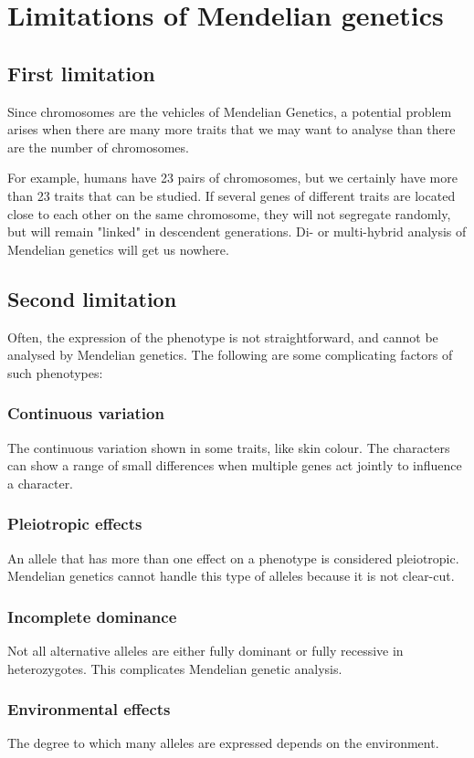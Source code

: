 \documentclass[11pt]{article}
\begin{document}
\section{Limitations of Mendelian genetics}
\label{sec:org412d7b7}

\subsection{First limitation}
\label{sec:orga2261d9}
Since chromosomes are the vehicles of Mendelian Genetics, a potential problem arises when there are many more traits that we may want to analyse than there are the number of chromosomes.


For example, humans have 23 pairs of chromosomes, but we certainly have more than 23 traits that can be studied. If several genes of different traits are located close to each other on the same chromosome, they will not segregate randomly, but will remain "linked" in descendent generations. Di- or multi-hybrid analysis of Mendelian genetics will get us nowhere.
\subsection{Second limitation}
\label{sec:orgb66cc55}
Often, the expression of the phenotype is not straightforward, and cannot be analysed by Mendelian genetics. The following are some complicating factors of such phenotypes:
\subsubsection{Continuous variation}
\label{sec:org15643c1}
The continuous variation shown in some traits, like skin colour. The characters can show a range of small differences when multiple genes act jointly to influence a character.
\subsubsection{Pleiotropic effects}
\label{sec:org99223fd}
An allele that has more than one effect on a phenotype is considered pleiotropic. Mendelian genetics cannot handle this type of alleles because it is not clear-cut.
\subsubsection{Incomplete dominance}
\label{sec:org7380786}
Not all alternative alleles are either fully dominant or fully recessive in heterozygotes. This complicates Mendelian genetic analysis.
\subsubsection{Environmental effects}
\label{sec:org91a2301}
The degree to which many alleles are expressed depends on the environment.
\end{document}
